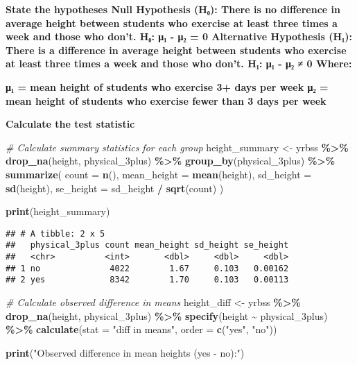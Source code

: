 \documentclass[
]{article}
\newenvironment{Shaded}{\begin{snugshade}}{\end{snugshade}}
\newcommand{\AttributeTok}[1]{\textcolor[rgb]{0.13,0.29,0.53}{#1}}
\newcommand{\CommentTok}[1]{\textcolor[rgb]{0.56,0.35,0.01}{\textit{#1}}}
\newcommand{\FunctionTok}[1]{\textcolor[rgb]{0.13,0.29,0.53}{\textbf{#1}}}
\newcommand{\NormalTok}[1]{#1}
\newcommand{\OtherTok}[1]{\textcolor[rgb]{0.56,0.35,0.01}{#1}}
\newcommand{\SpecialCharTok}[1]{\textcolor[rgb]{0.81,0.36,0.00}{\textbf{#1}}}
\newcommand{\StringTok}[1]{\textcolor[rgb]{0.31,0.60,0.02}{#1}}
\begin{document}
\textbf{State the hypotheses Null Hypothesis (H₀): There is no
difference in average height between students who exercise at least
three times a week and those who don't. H₀: μ₁ - μ₂ = 0 Alternative
Hypothesis (H₁): There is a difference in average height between
students who exercise at least three times a week and those who don't.
H₁: μ₁ - μ₂ ≠ 0 Where:}

\textbf{μ₁ = mean height of students who exercise 3+ days per week μ₂ =
mean height of students who exercise fewer than 3 days per week}

\textbf{Calculate the test statistic}

\begin{Shaded}
\begin{Highlighting}[]
\CommentTok{\# Calculate summary statistics for each group}
\NormalTok{height\_summary }\OtherTok{\textless{}{-}}\NormalTok{ yrbss }\SpecialCharTok{\%\textgreater{}\%}
  \FunctionTok{drop\_na}\NormalTok{(height, physical\_3plus) }\SpecialCharTok{\%\textgreater{}\%}
  \FunctionTok{group\_by}\NormalTok{(physical\_3plus) }\SpecialCharTok{\%\textgreater{}\%}
  \FunctionTok{summarize}\NormalTok{(}
    \AttributeTok{count =} \FunctionTok{n}\NormalTok{(),}
    \AttributeTok{mean\_height =} \FunctionTok{mean}\NormalTok{(height),}
    \AttributeTok{sd\_height =} \FunctionTok{sd}\NormalTok{(height),}
    \AttributeTok{se\_height =}\NormalTok{ sd\_height }\SpecialCharTok{/} \FunctionTok{sqrt}\NormalTok{(count)}
\NormalTok{  )}

\FunctionTok{print}\NormalTok{(height\_summary)}
\end{Highlighting}
\end{Shaded}

\begin{verbatim}
## # A tibble: 2 x 5
##   physical_3plus count mean_height sd_height se_height
##   <chr>          <int>       <dbl>     <dbl>     <dbl>
## 1 no              4022        1.67     0.103   0.00162
## 2 yes             8342        1.70     0.103   0.00113
\end{verbatim}

\begin{Shaded}
\begin{Highlighting}[]
\CommentTok{\# Calculate observed difference in means}
\NormalTok{height\_diff }\OtherTok{\textless{}{-}}\NormalTok{ yrbss }\SpecialCharTok{\%\textgreater{}\%}
  \FunctionTok{drop\_na}\NormalTok{(height, physical\_3plus) }\SpecialCharTok{\%\textgreater{}\%}
  \FunctionTok{specify}\NormalTok{(height }\SpecialCharTok{\textasciitilde{}}\NormalTok{ physical\_3plus) }\SpecialCharTok{\%\textgreater{}\%}
  \FunctionTok{calculate}\NormalTok{(}\AttributeTok{stat =} \StringTok{"diff in means"}\NormalTok{, }\AttributeTok{order =} \FunctionTok{c}\NormalTok{(}\StringTok{"yes"}\NormalTok{, }\StringTok{"no"}\NormalTok{))}

\FunctionTok{print}\NormalTok{(}\StringTok{"Observed difference in mean heights (yes {-} no):"}\NormalTok{)}
\end{Highlighting}
\end{Shaded}
\end{document}
